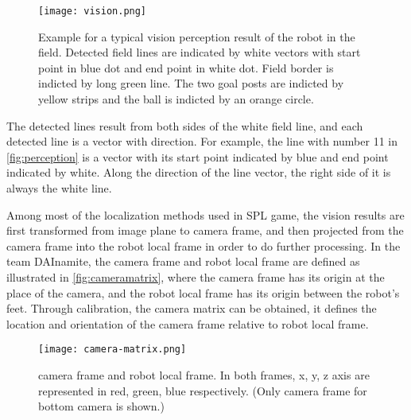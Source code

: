 \begin{figure}[h!]
  \centering
  \texttt{[image: vision.png]}
  \caption[Example for a typical vision perception result of the robot in the field.]{Example for a typical vision perception result of the robot in the field. Detected field lines are indicated by white vectors with start point in blue dot and end point in white dot. Field border is indicted by long green line. The two goal posts are indicted by yellow strips and the ball is indicted by an orange circle.}
  \label{fig:perception}
\end{figure}

The detected lines result from both sides of the white field line, and each detected line is a vector with direction. For example, the line with number 11 in \autoref{fig:perception} is a vector with its start point indicated by blue and end point indicated by white. Along the direction of the line vector, the right side of it is always the white line.

Among most of the localization methods used in \gls{SPL} game, the vision results are first transformed from image plane to camera frame, and then projected from the camera frame into the robot local frame in order to do further processing. In the team DAInamite, the camera frame and robot local frame are defined as illustrated in \autoref{fig:cameramatrix}, where the camera frame has its origin at the place of the camera, and the robot local frame has its origin between the robot's feet. Through calibration, the camera matrix can be obtained, it defines the location and orientation of the camera frame relative to robot local frame.
\begin{figure}[h!]
  \centering
  \texttt{[image: camera-matrix.png]}
  \caption[Only camera frame for bottom camera is shown]{camera frame and robot local frame. In both frames, x, y, z axis are represented in red, green, blue respectively. (Only camera frame for bottom camera is shown.)}
  \label{fig:cameramatrix}
\end{figure}

